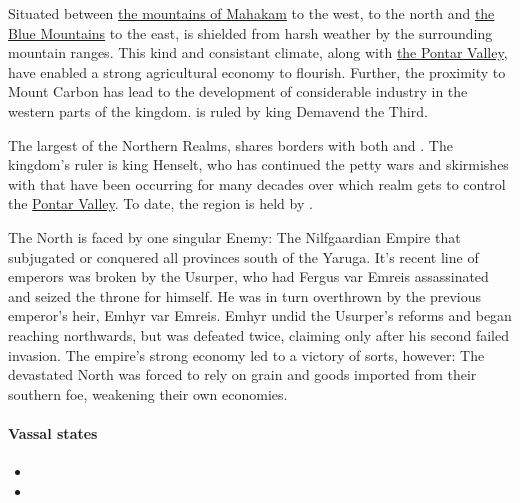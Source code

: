 
{
    Situated between \hyperref[region:mahakamMtns]{the mountains of Mahakam} to the west,  to the north and
    \hyperref[region:blueMtns]{the Blue Mountains} to the east,  is shielded from harsh weather by the surrounding mountain
    ranges. This kind and consistant climate, along with \hyperref[region:pontar]{the Pontar Valley}, have enabled a strong agricultural economy
    to flourish. Further, the proximity to Mount Carbon has lead to the development of considerable industry in the western parts of the kingdom.
     is ruled by king Demavend the Third.
}

{

}
{}

{
    The largest of the Northern Realms,  shares borders with both  and .
    The kingdom's ruler is king Henselt, who has continued the petty wars and skirmishes with  that have been occurring
    for many decades over which realm gets to control the \hyperref[region:pontar]{Pontar Valley}. To date, the region is held by .
}

{
    The North is faced by one singular Enemy: The Nilfgaardian Empire that subjugated or conquered all 
    provinces south of the Yaruga. It's recent line of emperors was broken by the Usurper, who had
    Fergus var Emreis assassinated and seized the throne for himself. He was in turn overthrown by the previous
    emperor's heir, Emhyr var Emreis. Emhyr undid the Usurper's reforms and began reaching northwards, but was 
    defeated twice, claiming only  after his second failed invasion. The empire's strong 
    economy led to a victory of sorts, however: The devastated North was forced to rely on grain and goods imported
    from their southern foe, weakening their own economies.
    
    \paragraph{Vassal states}
    \begin{itemize}
        \item {}
        \item {}
    \end{itemize}
}

